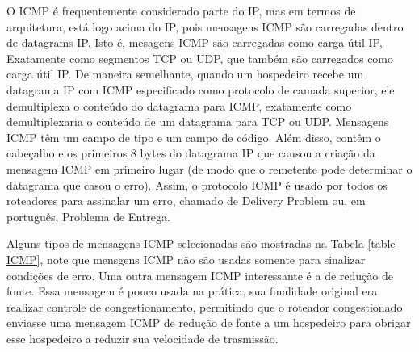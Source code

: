 \documentclass[
	article,			%
	11pt,				%
	oneside,			%
	a4paper,			%
	english,			%
	brazil,				%
	sumario=tradicional
	]{abntex2}
\begin{document}
 O ICMP é frequentemente considerado parte do IP, mas em termos de arquitetura, está logo acima do IP, pois mensagens ICMP são carregadas dentro de datagrams IP. Isto é, mesagens ICMP são carregadas como carga útil IP, Exatamente como segmentos TCP ou UDP, que também são carregados como carga útil IP. De maneira semelhante, quando um hospedeiro recebe um datagrama IP com ICMP especificado como protocolo de camada superior, ele demultiplexa o conteúdo do datagrama para ICMP, exatamente como demultiplexaria o conteúdo de um datagrama para TCP ou UDP.
 Mensagens ICMP têm um campo de tipo e um campo de código. Além disso, contêm o cabeçalho e os primeiros 8 bytes do datagrama IP que causou a criação da mensagem ICMP em primeiro lugar (de modo que o remetente pode determinar o datagrama que casou o erro). Assim, o protocolo ICMP é usado por todos os roteadores para assinalar um erro, chamado de Delivery Problem ou, em português, Problema de Entrega. \cite{Kurose}
 
 Alguns tipos de mensagens ICMP selecionadas são mostradas na Tabela \ref{table-ICMP}, note que mensgens ICMP não são usadas somente para sinalizar condições de erro.
 Uma outra mensagem ICMP interessante é a de redução de fonte. Essa mensagem é pouco usada na prática, sua finalidade original era realizar controle de congestionamento, permitindo que o roteador congestionado enviasse uma mensagem ICMP de redução de fonte a um hospedeiro para obrigar esse hospedeiro a reduzir sua velocidade de trasmissão.
 
\end{document}
